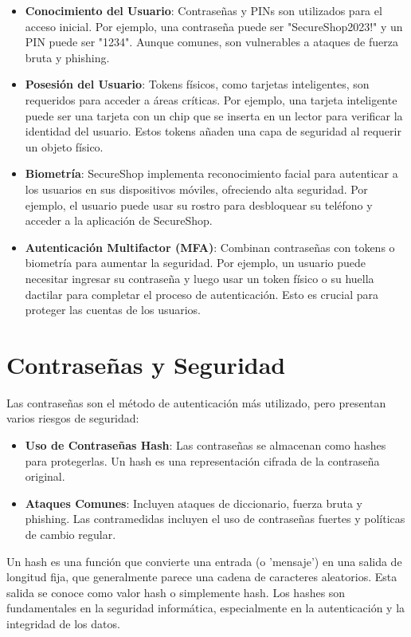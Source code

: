 \begin{itemize}
    \item \textbf{Conocimiento del Usuario}: Contraseñas y PINs son utilizados para el acceso inicial. Por ejemplo, una contraseña puede ser "SecureShop2023!" y un PIN puede ser "1234". Aunque comunes, son vulnerables a ataques de fuerza bruta y phishing.
    \item \textbf{Posesión del Usuario}: Tokens físicos, como tarjetas inteligentes, son requeridos para acceder a áreas críticas. Por ejemplo, una tarjeta inteligente puede ser una tarjeta con un chip que se inserta en un lector para verificar la identidad del usuario. Estos tokens añaden una capa de seguridad al requerir un objeto físico.
    \item \textbf{Biometría}: SecureShop implementa reconocimiento facial para autenticar a los usuarios en sus dispositivos móviles, ofreciendo alta seguridad. Por ejemplo, el usuario puede usar su rostro para desbloquear su teléfono y acceder a la aplicación de SecureShop.
    \item \textbf{Autenticación Multifactor (MFA)}: Combinan contraseñas con tokens o biometría para aumentar la seguridad. Por ejemplo, un usuario puede necesitar ingresar su contraseña y luego usar un token físico o su huella dactilar para completar el proceso de autenticación. Esto es crucial para proteger las cuentas de los usuarios.
\end{itemize}



\section{Contraseñas y Seguridad}
Las contraseñas son el método de autenticación más utilizado, pero presentan varios riesgos de seguridad:
\begin{itemize}
    \item \textbf{Uso de Contraseñas Hash}: Las contraseñas se almacenan como hashes para protegerlas. Un hash es una representación cifrada de la contraseña original.
    \item \textbf{Ataques Comunes}: Incluyen ataques de diccionario, fuerza bruta y phishing. Las contramedidas incluyen el uso de contraseñas fuertes y políticas de cambio regular.
\end{itemize}


Un hash es una función que convierte una entrada (o 'mensaje') en una salida de longitud fija, que generalmente parece una cadena de caracteres aleatorios. Esta salida se conoce como valor hash o simplemente hash. Los hashes son fundamentales en la seguridad informática, especialmente en la autenticación y la integridad de los datos.



